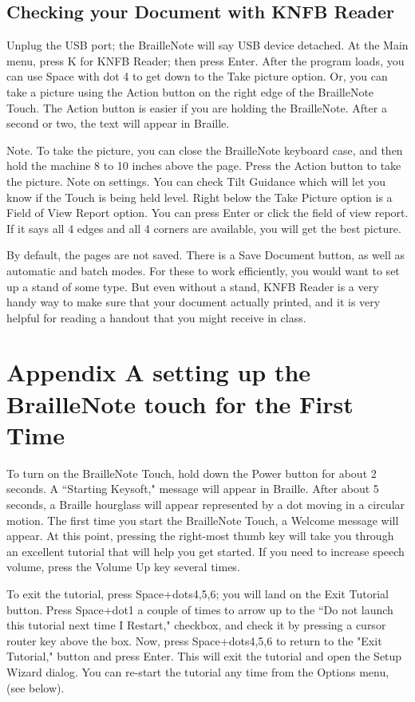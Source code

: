 \documentclass[10pt,letterpaper,twoside]{report}
\begin{document}
{{{\subsection{Checking your Document with KNFB Reader}

Unplug the USB port; the BrailleNote will say USB device detached. 
At the Main menu, press K for KNFB Reader; then press Enter. 
After the program loads, you can use Space with dot 4 to get down to the Take picture option. Or, you can take a picture using the Action button on the right edge of the BrailleNote Touch. The Action button is easier if you are holding the BrailleNote. After a second or two, the text will appear in Braille. 

Note. To take the picture, you can close the BrailleNote keyboard case, and then hold the machine 8 to 10 inches above the page. Press the Action button to take the picture. 
Note on settings. 
You can check Tilt Guidance which will let you know if the Touch is being held level. 
Right below the Take Picture option is a Field of View Report option. You can press Enter or click the field of view report. If it says all 4 edges and all 4 corners are available, you will get the best picture. 

By default, the pages are not saved. There is a Save Document button, as well as automatic and batch modes. For these to work efficiently, you would want to set up a stand of some type. But even without a stand, KNFB Reader is a very handy way to make sure that your document actually printed, and it is very helpful for reading a handout that you might receive in class.

\section{Appendix A setting up the BrailleNote touch for the First Time}

To turn on the BrailleNote Touch, hold down the Power button for about 2 seconds. A ``Starting Keysoft," message will appear in Braille. After about 5 seconds, a Braille hourglass will appear represented by a dot moving in a circular motion. The first time you start the BrailleNote Touch, a Welcome message will appear. At this point, pressing the right-most thumb key will take you through an excellent tutorial that will help you get started. If you need to increase speech volume, press the Volume Up key several times.

To exit the tutorial, press Space+dots4,5,6; you will land on the Exit Tutorial button. Press Space+dot1 a couple of times to arrow up to the ``Do not launch this tutorial next time I Restart," checkbox, and check it by pressing a cursor router key above the box. Now, press Space+dots4,5,6 to return to the "Exit Tutorial," button and press Enter. This will exit the tutorial and open the Setup Wizard dialog. You can re-start the tutorial any time from the Options menu, (see below).

}}}
\end{document}
